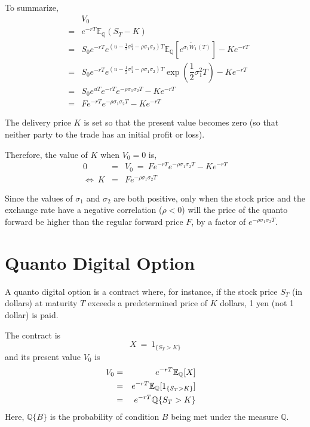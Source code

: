 \documentclass[uplatex,a4j,12pt,dvipdfmx]{jsarticle}
\begin{document}
To summarize,
%
%
\begin{eqnarray*}
	&& V_{0}
	\\ &=&
	e^{-rT}
	\mathbb{E}_{\mathbb{Q}}(S_{T}-K)
	\\ &=&
	S_{0}
	e^{-rT}
	e^{(u - \frac{1}{2} \sigma_{1}^{2} - \rho \sigma_{1} \sigma_{2})T}
	\mathbb{E}_{\mathbb{Q}}
		[e^{\sigma_{1} \tilde{W}_{1}(T)}]
	-
	Ke^{-rT}
	\\ &=&
	S_{0}
	e^{-rT}
	e^{(u - \frac{1}{2} \sigma_{1}^{2} - \rho \sigma_{1} \sigma_{2})T}
	\exp \left(\dfrac{1}{2} \sigma_{1}^{2} T \right)
	-
	Ke^{-rT}
	\\ &=&
	S_{0} e^{uT}
	e^{-rT}
	e^{- \rho \sigma_{1} \sigma_{2} T}
	-
	Ke^{-rT}
	\\ &=&
	F
	e^{-rT}
	e^{- \rho \sigma_{1} \sigma_{2} T}
	-
	Ke^{-rT}
\end{eqnarray*}
%
%

The delivery price $K$ is set so that the present value becomes zero (so that neither party to the trade has an initial profit or loss).

Therefore, the value of $K$ when $V_{0}=0$ is,
%
%
\begin{eqnarray*}
	0 &=& V_{0}
	\ = \
	F
	e^{-rT}
	e^{- \rho \sigma_{1} \sigma_{2} T}
	-
	Ke^{-rT}
	\\
	\Longleftrightarrow
	\
	K
	&=&
	F
	e^{- \rho \sigma_{1} \sigma_{2} T}
\end{eqnarray*}
%
%

Since the values of $\sigma_{1}$ and $\sigma_{2}$ are both positive, only when the stock price and the exchange rate have a negative correlation ($\rho < 0$) will the price of the quanto forward be higher than the regular forward price $F$, by a factor of $e^{- \rho \sigma_{1} \sigma_{2} T}$.


\section{Quanto Digital Option}

A quanto digital option is a contract where, for instance, if the stock price $S_{T}$ (in dollars) at maturity $T$ exceeds a predetermined price of $K$ dollars, 1 yen (not 1 dollar) is paid.

The contract is
$$
	X
	\ = \
	1_{ \{ S_{T}>K \} }
$$
and its present value $V_{0}$ is
%
%
\begin{eqnarray*}
	\hspace{-10mm}
	V_{0}
	& = &
	e^{-rT}
	\mathbb{E}_{\mathbb{Q}}
		[X]
	\\ & = &
	e^{-rT}
	\mathbb{E}_{\mathbb{Q}}
		[1_{ \{ S_{T}>K \} }]
	\\ & = &
	e^{-rT}
	\mathbb{Q}
	\{ S_{T}>K \}
\end{eqnarray*}
%
%
Here, $\mathbb{Q}\{B\}$ is the probability of condition $B$ being met under the measure $\mathbb{Q}$.
\end{document}
